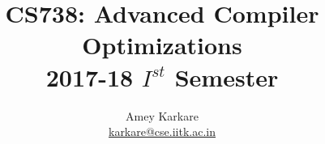 \setfootline{\insertshortauthor, \insertshortinstitute
  \hfill   \insertshorttitle
  \hfill \insertframenumber/\inserttotalframenumber} 
\newcommand{\mypart}[1]{%
  \frame[plain]{\mbox{}\vfill \psshadowbox{\huge #1} \vfill\mbox{}}
}
\author[karkare]{Amey Karkare \\ \url{karkare@cse.iitk.ac.in}}
\date[]{}%
\title[CS738]{CS738: Advanced Compiler Optimizations\\
  2017-18 $I^{st}$ Semester\\ \mbox{}} 
\subtitle[]{}

